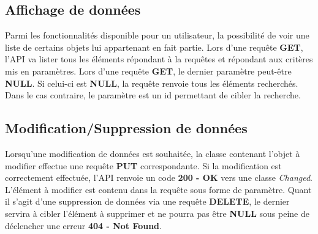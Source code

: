 \subsection{Affichage de données}
\begin{flushleft}
Parmi les fonctionnalités disponible pour un utilisateur, la possibilité de voir une liste de certains objets lui appartenant en fait partie. Lors d'une requête \textbf{GET}, l'API va lister tous les éléments répondant à la requêtes et répondant aux critères mis en paramètres. Lors d'une requête \textbf{GET}, le dernier paramètre peut-être \textbf{NULL}. Si celui-ci est \textbf{NULL}, la requête renvoie tous les éléments recherchés. Dans le cas contraire, le paramètre est un id permettant de cibler la recherche.
\end{flushleft}

\subsection{Modification/Suppression de données}
\begin{flushleft}
Lorsqu'une modification de données est souhaitée, la classe contenant l'objet à modifier effectue une requête \textbf{PUT} correspondante. Si la modification est correctement effectuée, l'API renvoie un code \textbf{200 - OK} vers une classe \emph{Changed}. L'élément à modifier est contenu dans la requête sous forme de paramètre. Quant il s'agit d'une suppression de données via une requête \textbf{DELETE}, le dernier servira à cibler l'élément à supprimer et ne pourra pas être \textbf{NULL} sous peine de déclencher une erreur \textbf{404 - Not Found}.
\end{flushleft}

